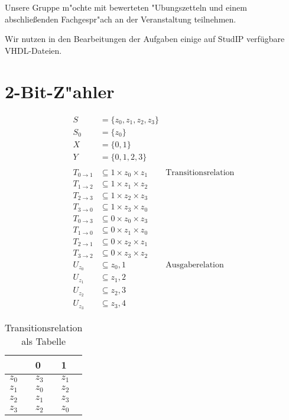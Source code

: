 \documentclass{pi3}
\begin{document}

Unsere Gruppe m"ochte mit bewerteten "Ubungszetteln und einem abschlie{\ss}enden Fachgespr"ach an der Veranstaltung teilnehmen.

Wir nutzen in den Bearbeitungen der Aufgaben einige auf StudIP verfügbare VHDL-Dateien.

\section{2-Bit-Z"ahler}

\begin{align*}
	S 	&=	\{z_0, z_1, z_2, z_3\}\\
	S_0 &=	\{z_0 \}\\
	X	&=	\{0, 1\}\\
	Y	&=	\{0, 1, 2, 3\}\\
	\\
	T_{0 \rightarrow 1}	&\subseteq	1 \times z_0 \times z_1 & \text{Transitionsrelation}\\
	T_{1 \rightarrow 2}	&\subseteq	1 \times z_1 \times z_2\\
	T_{2 \rightarrow 3}	&\subseteq	1 \times z_2 \times z_3\\
	T_{3 \rightarrow 0}	&\subseteq	1 \times z_3 \times z_0\\
	T_{0 \rightarrow 3}	&\subseteq	0 \times z_0 \times z_3\\
	T_{1 \rightarrow 0}	&\subseteq	0 \times z_1 \times z_0\\
	T_{2 \rightarrow 1}	&\subseteq	0 \times z_2 \times z_1\\
	T_{3 \rightarrow 2}	&\subseteq	0 \times z_3 \times z_2\\
	U_{z_0}	&\subseteq	z_0, 1&\text{Ausgaberelation}\\
	U_{z_1}	&\subseteq	z_1, 2\\
	U_{z_2}	&\subseteq	z_2, 3\\
	U_{z_3}	&\subseteq	z_3, 4
\end{align*}


\begin{table}[h]
\centering
\caption{Transitionsrelation als Tabelle}
\label{my-label}
\begin{tabular}{|l|l|l|}
\hline
 & 0 & 1 \\ \hline
$z_0$ & $z_3$ & $z_1$ \\ \hline
$z_1$ & $z_0$ & $z_2$ \\ \hline
$z_2$ & $z_1$ & $z_3$ \\ \hline
$z_3$ & $z_2$ & $z_0$ \\ \hline
\end{tabular}
\end{table}
\end{document}
